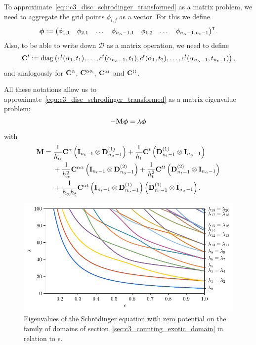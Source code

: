 To approximate~\eqref{equ:c3_disc_schrodinger_transformed} as a matrix problem, we need to aggregate the grid points $\phi_{i,j}$ as a vector. For this we define
$$
  \vb*{\phi} := {\begin{pmatrix}
      \phi_{1,1} & \phi_{2,1} & \dots & \phi_{n_\alpha-1, 1} & \phi_{1,2} & \dots & \phi_{n_\alpha-1, n_t-1}
    \end{pmatrix}}^\intercal\text{.}
$$
Also, to be able to write down $\mathcal{D}$ as a matrix operation, we need to define
$$
  \vb{C}^{t} := \operatorname{diag}\left(
  c^{t}(\alpha_1, t_1) , \dots , c^{t}(\alpha_{n_\alpha-1}, t_1) , c^{t}(\alpha_1, t_2) , \dots , c^{t}(\alpha_{n_\alpha-1}, t_{n_t-1})
  \right)\text{,}
$$
and analogously for $\vb{C}^{\alpha}$, $\vb{C}^{\alpha\alpha}$, $\vb{C}^{\alpha t}$ and $\vb{C}^{t t}$.

All these notations allow us to approximate~\eqref{equ:c3_disc_schrodinger_transformed} as a matrix eigenvalue problem:
$$
  -\vb{M} \vb*{\phi} = \lambda \vb*{\phi}
$$
with
\begin{align*}
  \vb{M} = {} & \frac{1}{h_\alpha} \vb{C}^{\alpha} \left(\vb{I}_{n_t - 1}\otimes \vb{D}^{(1)}_{n_\alpha - 1} \right) + \frac{1}{h_t} \vb{C}^{t} \left(\vb{D}^{(1)}_{n_t - 1}  \otimes \vb{I}_{n_\alpha - 1}\right)                \\
              & {} + \frac{1}{h_\alpha^2} \vb{C}^{\alpha\alpha} \left(\vb{I}_{n_t - 1}\otimes \vb{D}^{(2)}_{n_\alpha - 1}\right) + \frac{1}{h_t^2} \vb{C}^{tt} \left(\vb{D}^{(2)}_{n_t - 1}  \otimes \vb{I}_{n_\alpha - 1}\right) \\
              & {} + \frac{1}{h_\alpha h_t} \vb{C}^{\alpha t} \left(\vb{I}_{n_t - 1}\otimes \vb{D}^{(1)}_{n_\alpha - 1} \right) \left( \vb{D}^{(1)}_{n_t - 1}  \otimes \vb{I}_{n_\alpha - 1} \right)\text{.}
\end{align*}

\begin{figure}
  \begin{center}
    \includegraphics[width=\textwidth]{img/chapter3/on_disc/eigenvalues_flow.pdf}
    \caption{Eigenvalues of the Schrödinger equation with zero potential on the family of domains of section~\ref{sec:c3_counting_exotic_domain} in relation to $\epsilon$.}
    \label{fig:c3_disc_eigenvalues_flow}
  \end{center}
\end{figure}


